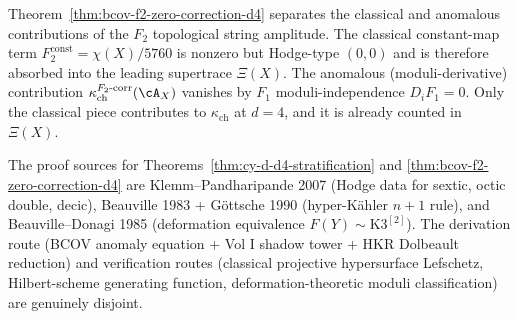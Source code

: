 \begin{remark}
\label{rem:cy-strat-d4-ghost-theorem}
Theorem~\ref{thm:bcov-f2-zero-correction-d4} separates the classical
and anomalous contributions of the $F_2$ topological string amplitude.
The classical constant-map term $F_2^{\mathrm{const}} = \chi(X)/5760$
is nonzero but Hodge-type $(0,0)$ and is therefore absorbed into the
leading supertrace $\Xi(X)$. The anomalous (moduli-derivative)
contribution $\kappa_{\mathrm{ch}}^{F_2\text{-corr}}(\cA_X)$ vanishes by
$F_1$ moduli-independence $D_i F_1 = 0$. Only the classical piece
contributes to $\kappa_{\mathrm{ch}}$ at $d = 4$, and it is already
counted in $\Xi(X)$.
\end{remark}

\begin{remark}[Proof sources for \texorpdfstring{$d = 4$}{d = 4}]
\label{rem:cy-strat-d4-sources}
The proof sources for Theorems~\ref{thm:cy-d-d4-stratification} and
\ref{thm:bcov-f2-zero-correction-d4} are
Klemm--Pandharipande 2007 (Hodge data for sextic, octic double, decic),
Beauville 1983 + G\"ottsche 1990 (hyper-K\"ahler $n+1$ rule), and
Beauville--Donagi 1985 (deformation equivalence $F(Y) \sim \mathrm{K3}^{[2]}$).
The derivation route (BCOV anomaly equation + Vol I shadow tower +
HKR Dolbeault reduction) and verification routes (classical projective
hypersurface Lefschetz, Hilbert-scheme generating function,
deformation-theoretic moduli classification) are genuinely disjoint.
\end{remark}

